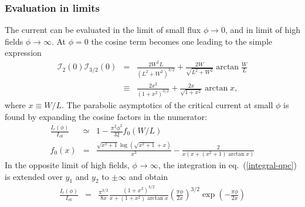 \subsubsection*{Evaluation in limits}
The current can be evaluated in the limit of small flux $\phi \rightarrow 0$, and in limit of high fields $\phi \rightarrow \infty$. 
At $\phi=0$ the cosine term becomes one leading to the simple expression
\begin{eqnarray}
\mathcal{I}_2(0)\mathcal{I}_{3/2}(0) &=&
\frac{2 W^2 L}{\left( L^2 + W^2 \right)^{3/2}} + \frac{2W}{\sqrt{L^2 + W^2}} \arctan \frac{W}{L}  \\
&\equiv & \frac{2 x^2}{\left( 1 + x^2 \right)^{3/2}} + \frac{2 x}{\sqrt{1 + x^2} } \arctan x,
\label{Ic-0}
\end{eqnarray}
where $x \equiv W/L$.
The parabolic asymptotics of the critical current at small $\phi$ is found by expanding the cosine factors in the numerator:
\begin{eqnarray}
\frac{I_c(\phi)}{I_{c0}}&\simeq& 1 - \frac{\pi ^2 \phi^2 }{32} f_0(W/L) \\
f_0(x) &=& \frac{\sqrt{x^2+1} \log \left(\sqrt{x^2+1}+x\right)}{x^3} - \frac{2}{x (x+(x^2+1) \arctan x)} 
\end{eqnarray}
In the opposite limit of high fields, $\phi\to \infty$, the integration in eq.~(\ref{integral-qpc}) is extended over $y_1$ and $y_2$ to $\pm \infty$ and obtain
\begin{eqnarray}
\frac{I_c(\phi)}{I_{c0}} &=& \frac{\pi^{3/2}}{8 x} \frac{(1 + x^2)^{3/2}}{x + (1+x^2) \arctan x} \left( \frac{\pi \phi}{2 x} \right)^{3/2} \exp \left( - \frac{\pi \phi}{2 x} \right)
\label{eq:large-phi}
\end{eqnarray}
